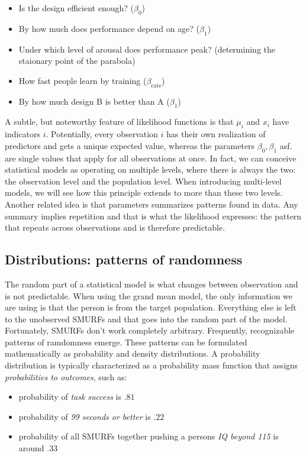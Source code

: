 \documentclass[]{svmono}
\providecommand{\tightlist}{%
  \setlength{\itemsep}{0pt}\setlength{\parskip}{0pt}}
\theoremstyle{definition}
\theoremstyle{definition}
\theoremstyle{definition}
\theoremstyle{remark}
\begin{document}
\begin{itemize}
\tightlist
\item
  Is the design efficient enough? (\(\beta_0\))
\item
  By how much does performance depend on age? (\(\beta_1\))
\item
  Under which level of arousal does performance peak? (determining the
  staionary point of the parabola)
\item
  How fast people learn by training (\(\beta_\textrm{rate}\))
\item
  By how much design B is better than A (\(\beta_1\))
\end{itemize}

A subtle, but noteworthy feature of likelihood functions is that
\(\mu_i\) and \(x_i\) have indicators \(i\). Potentially, every
observation \(i\) has their own realization of predictors and gets a
unique expected value, whereas the parameters \(\beta_0, \beta_1\) asf.
are single values that apply for all observations at once. In fact, we
can conceive statistical models as operating on multiple levels, where
there is always the two: the observation level and the population level.
When introducing multi-level models, we will see how this principle
extends to more than these two levels. Another related idea is that
parameters summarizes patterns found in data. Any summary implies
repetition and that is what the likelihood expresses: the pattern that
repeats across observations and is therefore predictable.

\subsection{Distributions: patterns of randomness}\label{distributions}

The random part of a statistical model is what changes between
observation and is not predictable. When using the grand mean model, the
only information we are using is that the person is from the target
population. Everything else is left to the unobserved SMURFs and that
goes into the random part of the model. Fortunately, SMURFs don't work
completely arbitrary. Frequently, recognizable patterns of ramdomness
emerge. These patterns can be formulated mathematically as probability
and density distributions. A probability distribution is typically
characterized as a probability mass function that assigns
\emph{probabilities to outcomes}, such as:

\begin{itemize}
\tightlist
\item
  probability of \emph{task success} is \(.81\)
\item
  probability of \emph{99 seconds or better} is \(.22\)
\item
  probability of all SMURFs together pushing a persons \emph{IQ beyond
  115} is around \(.33\)
\end{itemize}
\end{document}
